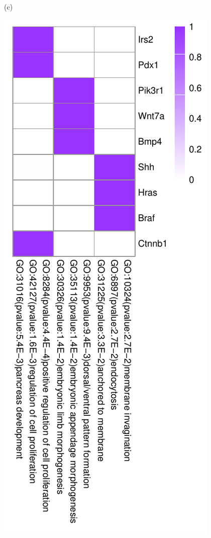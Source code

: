 \documentclass{bmcart}
\begin{document}
\begin{figure}[!h]
\begin{minipage}{.30\linewidth}
    \centerline{(c)}
  \end{minipage}
  \hfil
  \begin{minipage}{.3\linewidth}
   \includegraphics[width=\linewidth]{DrawPictures/v23.pdf}

\end{minipage}
\end{figure}
\end{document}
